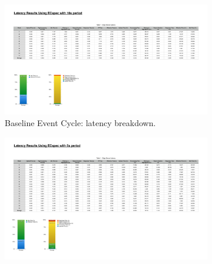 \begin{figure}[ht!]
 \centering
 \begin{subfigure}{.5\textwidth}
   \centering
   \includegraphics[height=\linewidth]{./images/edge_ecspec_breakdown}
   \caption{Baseline Event Cycle: latency breakdown.}
   \label{fig:ecspec_base}
 \end{subfigure}%
 \begin{subfigure}{.5\textwidth}
   \centering
   \includegraphics[height=\linewidth]{./images/edge_ecspecf_breakdown}

\end{subfigure}
\end{figure}
